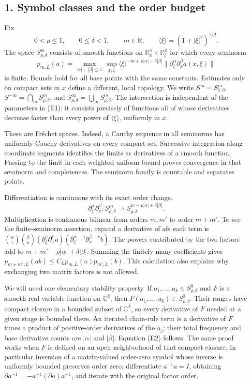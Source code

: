 \documentclass[
  11pt,
]{article}
\begin{document}
\subsection{1. Symbol classes and the order
budget}\label{symbol-classes-and-the-order-budget}

Fix \[
0<\rho\leq1,\qquad 0\leq\delta<1,\qquad m\in\mathbb R,
\qquad \langle\xi\rangle=(1+|\xi|^2)^{1/2}.
\tag{E1}
\] The space \(S^m_{\rho,\delta}\) consists of smooth functions on
\(\mathbb R_x^n\times\mathbb R_\xi^n\) for which every seminorm \[
p_{m,L}(a)=\max_{|\alpha|+|\beta|\leq L}
\sup_{x,\xi}\langle\xi\rangle^{-m+\rho|\alpha|-\delta|\beta|}
\|\partial_\xi^\alpha\partial_x^\beta a(x,\xi)\|
\tag{E2}
\] is finite. Bounds hold for all base points with the same constants.
Estimates only on compact sets in \(x\) define a different, local
topology. We write \(S^m=S^m_{1,0}\),
\(S^{-\infty}=\bigcap_m S^m_{\rho,\delta}\), and
\(S^\infty_{\rho,\delta}=\bigcup_mS^m_{\rho,\delta}\). The intersection
is independent of the parameters in (E1): it consists precisely of
functions all of whose derivatives decrease faster than every power of
\(\langle\xi\rangle\), uniformly in \(x\).

These are Fréchet spaces. Indeed, a Cauchy sequence in all seminorms has
uniformly Cauchy derivatives on every compact set. Successive
integration along coordinate segments identifies the limits as
derivatives of a smooth function. Passing to the limit in each weighted
uniform bound proves convergence in that seminorm and completeness. The
seminorm family is countable and separates points.

Differentiation is continuous with its exact order change, \[
\partial_\xi^\alpha\partial_x^\beta:
S^m_{\rho,\delta}\longrightarrow
S^{m-\rho|\alpha|+\delta|\beta|}_{\rho,\delta}.
\tag{E3}
\] Multiplication is continuous bilinear from orders \(m,m'\) to order
\(m+m'\). To see the finite-seminorm assertion, expand a derivative of
\(ab\): each term is \(\binom\alpha\gamma\binom\beta\nu
(\partial_\xi^\gamma\partial_x^\nu a)
(\partial_\xi^{\alpha-\gamma}\partial_x^{\beta-\nu}b)\). The powers
contributed by the two factors add to
\(m+m'-\rho|\alpha|+\delta|\beta|\). Summing the finitely many
coefficients gives \(p_{m+m',L}(ab)\leq C_Lp_{m,L}(a)p_{m',L}(b)\). This
calculation also explains why exchanging two matrix factors is not
allowed.

We will need one elementary stability property. If
\(a_1,\ldots,a_k\in S^0_{\rho,\delta}\) and \(F\) is a smooth
real-variable function on \(\mathbb C^k\), then
\(F(a_1,\ldots,a_k)\in S^0_{\rho,\delta}\). Their ranges have compact
closure in a bounded subset of \(\mathbb C^k\), so every derivative of
\(F\) needed at a given stage is bounded there. An iterated chain-rule
term is a derivative of \(F\) times a product of positive-order
derivatives of the \(a_j\); their total frequency and base derivative
counts are \(|\alpha|\) and \(|\beta|\). Equation (E2) follows. The same
proof works when \(F\) is defined on an open neighborhood of that
compact closure. In particular inversion of a matrix-valued order-zero
symbol whose inverse is uniformly bounded preserves order zero:
differentiate \(a^{-1}a=I\), obtaining
\(\partial a^{-1}=-a^{-1}(\partial a)a^{-1}\), and iterate with the
original factor order.
\end{document}

